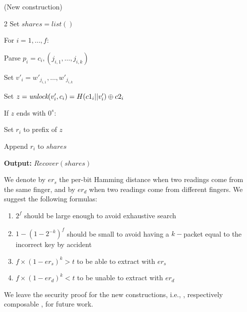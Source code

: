 \begin{construction}{(New construction)}
\begin{multicols}{2}
Set $shares = list() $

For $i = 1,\dots, f$:
        
        \quad Parse $p_{i} = c_{i}, (j_{i,1},\dots, j_{i,k})$
        
        \quad Set $v'_{i} = w'_{j_{i,1}},\dots, w'_{j_{i,k}}$
        
        \quad Set $z = \textit{unlock}(v'_{i}, c_{i}) = H(c1_{i}||v'_{i}) \oplus c2_{i}$
        
        \quad If $z$ ends with $0^s$:
        
        \qquad Set $r_i$ to prefix of $z$
        
        \qquad Append $r_i$ to $shares$
    
\textbf{Output:} $Recover(shares)$

\end{multicols}
\end{construction}


We denote by $er_s$ the per-bit Hamming distance when two readings come from the same finger, and by $er_d$ when two readings come from different fingers. We suggest the following formulas:
\begin{enumerate}
    \item $2^f$ should be large enough to avoid exhaustive search
    \item $1-\left(1-2^{-k}\right)^f$ should be small to avoid having a $k-$packet equal to the incorrect key by accident
    \item $f\times(1-er_s)^k > t$ to be able to extract with $er_s$
    \item $f\times(1-er_d)^k < t$ to be unable to extract with $er_d$
\end{enumerate}


We leave the security proof for the new constructions, i.e., \rfe, respectively composable \dl, for future work.



